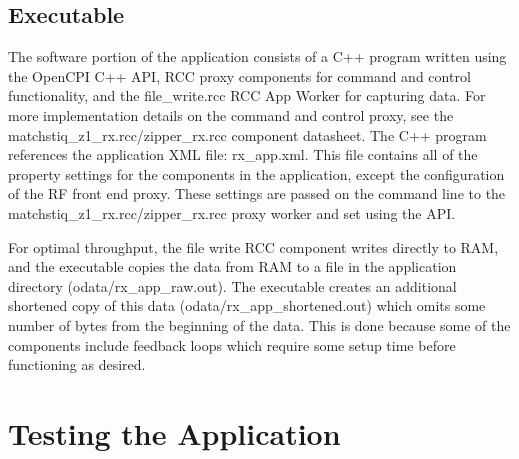 \documentclass{article}
\begin{document}
\subsection{Executable}
\noindent The software portion of the application consists of a C++ program written using the OpenCPI C++ API, RCC proxy components for command and control functionality, and the file\_write.rcc RCC App Worker for capturing data. For more implementation details on the command and control proxy, see the matchstiq\_z1\_rx.rcc/zipper\_rx.rcc component datasheet. The C++ program references the application XML file: rx\_app.xml. This file contains all of the property settings for the components in the application, except the configuration of the RF front end proxy. These settings are passed on the command line to the matchstiq\_z1\_rx.rcc/zipper\_rx.rcc proxy worker and set using the API.\par\bigskip
\noindent For optimal throughput, the file write RCC component writes directly to RAM, and the executable copies the data from RAM to a file in the application directory (odata/rx\_app\_raw.out). The executable creates an additional shortened copy of this data (odata/rx\_app\_shortened.out) which omits some number of bytes from the beginning of the data. This is done because some of the components include feedback loops which require some setup time before functioning as desired.
\section{Testing the Application}
\end{document}
